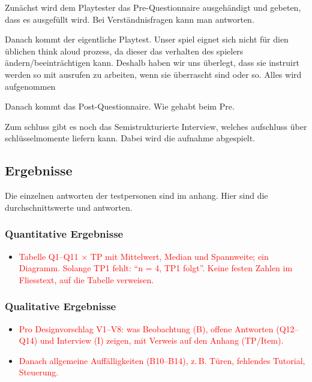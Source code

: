 \documentclass[../Main.tex]{subfiles}
\begin{document}
Zunächst wird dem Playtester das Pre-Questionnaire ausgehändigt und gebeten, dass es ausgefüllt wird. Bei Verständnisfragen kann man antworten.

Danach kommt der eigentliche Playtest. Unser spiel eignet sich nicht für dien üblichen think aloud prozess, da dieser das verhalten des spielers ändern/beeinträchtigen kann. Deshalb haben wir uns überlegt, dass sie instruirt werden so mit ausrufen zu arbeiten, wenn sie überrascht sind oder so. Alles wird aufgenommen

Danach kommt das Post-Questionnaire. Wie gehabt beim Pre.

Zum schluss gibt es noch das Semistrukturierte Interview, welches aufschluss über schlüsselmomente liefern kann. Dabei wird die aufnahme abgespielt.

\subsection{Ergebnisse}
Die einzelnen antworten der testpersonen sind im anhang. Hier sind die durchschnittswerte und antworten.

\subsubsection{Quantitative Ergebnisse} \label{sec:ErgQuant}

\begin{itemize}[leftmargin=1.5cm]
    \item \textcolor{red}{Tabelle Q1--Q11 $\times$ TP mit Mittelwert, Median und Spannweite; ein Diagramm. Solange TP1 fehlt: \enquote{n = 4, TP1 folgt}. Keine festen Zahlen im Fliesstext, auf die Tabelle verweisen.}
\end{itemize}

\subsubsection{Qualitative Ergebnisse} \label{sec:ErgQual}

\begin{itemize}[leftmargin=1.5cm]
    \item \textcolor{red}{Pro Designvorschlag V1--V8: was Beobachtung (B), offene Antworten (Q12--Q14) und Interview (I) zeigen, mit Verweis auf den Anhang (TP/Item).}
    \item \textcolor{red}{Danach allgemeine Auffälligkeiten (B10--B14), z.\,B. Türen, fehlendes Tutorial, Steuerung.}
\end{itemize}
\end{document}
